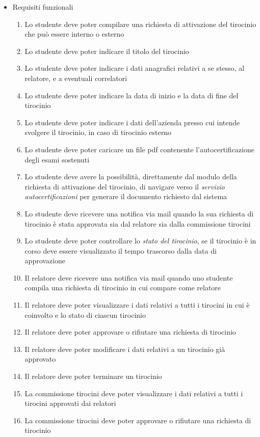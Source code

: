 \documentclass[12pt]{article}
\begin{document}
\begin{itemize}
   \item Requisiti funzionali
   \begin{enumerate}
      \item Lo studente deve poter compilare una richiesta di attivazione del tirocinio che può essere interno o esterno
      \item Lo studente deve poter indicare il titolo del tirocinio
      \item Lo studente deve poter indicare i dati anagrafici relativi a se stesso, al relatore, e a eventuali correlatori
      \item Lo studente deve poter indicare la data di inizio e la data di fine del tirocinio
      \item Lo studente deve poter indicare i dati dell'azienda presso cui intende svolgere il tirocinio, in caso di tirocinio esterno
      \item Lo studente deve poter caricare un file pdf contenente l'autocertificazione degli esami sostenuti
      \item Lo studente deve avere la possibilità, direttamente dal modulo della richiesta di attivazione del tirocinio, di navigare verso il \emph{servizio autocertificazioni} per generare il documento richiesto dal sistema
      \item Lo studente deve ricevere una notifica via mail quando la sua richiesta di tirocinio è stata approvata sia dal relatore sia dalla commissione tirocini
      \item Lo studente deve poter controllare lo \emph{stato del tirocinio}, se il tirocinio è in corso deve essere visualizzato il tempo trascorso dalla data di approvazione
      \item Il relatore deve ricevere una notifica via mail quando uno studente compila una richiesta di tirocinio in cui compare come relatore
      \item Il relatore deve poter visualizzare i dati relativi a tutti i tirocini in cui è coinvolto e lo stato di ciascun tirocinio
      \item Il relatore deve poter approvare o rifiutare una richiesta di tirocinio
      \item Il relatore deve poter modificare i dati relativi a un tirocinio già approvato
      \item Il relatore deve poter terminare un tirocinio
      \item La commissione tirocini deve poter visualizzare i dati relativi a tutti i tirocini approvati dai relatori
      \item La commissione tirocini deve poter approvare o rifiutare una richiesta di tirocinio
   \end{enumerate}


\end{itemize}
\end{document}
